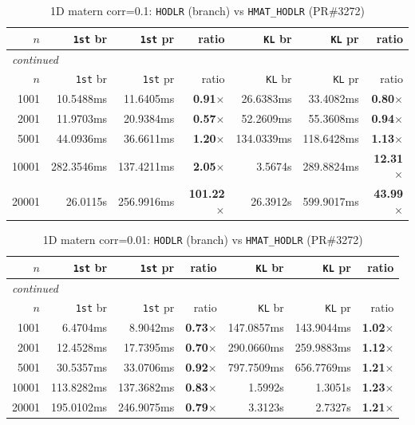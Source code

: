 \documentclass[11pt,a4paper]{article}
\begin{document}
\small\begin{center}
\begin{longtable}{rrrrrrr}
\caption{1D matern corr=0.1: \texttt{HODLR} (branch) vs \texttt{HMAT\_HODLR} (PR\#3272)}
\\\toprule
$n$ & \texttt{1st} br & \texttt{1st} pr & ratio & \texttt{KL} br & \texttt{KL} pr & ratio\\
\midrule
\endfirsthead
\multicolumn{7}{l}{\small\emph{continued}}\\
\toprule
$n$ & \texttt{1st} br & \texttt{1st} pr & ratio & \texttt{KL} br & \texttt{KL} pr & ratio\\
\midrule
\endhead

1001 & 10.5488ms & 11.6405ms & \textbf{0.91$\times$} & 26.6383ms & 33.4082ms & \textbf{0.80$\times$}\\
2001 & 11.9703ms & 20.9384ms & \textbf{0.57$\times$} & 52.2609ms & 55.3608ms & \textbf{0.94$\times$}\\
5001 & 44.0936ms & 36.6611ms & \textbf{1.20$\times$} & 134.0339ms & 118.6428ms & \textbf{1.13$\times$}\\
10001 & 282.3546ms & 137.4211ms & \textbf{2.05$\times$} & 3.5674s & 289.8824ms & \textbf{12.31$\times$}\\
20001 & 26.0115s & 256.9916ms & \textbf{101.22$\times$} & 26.3912s & 599.9017ms & \textbf{43.99$\times$}\\
\bottomrule\end{longtable}\end{center}
\small\begin{center}
\begin{longtable}{rrrrrrr}
\caption{1D matern corr=0.01: \texttt{HODLR} (branch) vs \texttt{HMAT\_HODLR} (PR\#3272)}
\\\toprule
$n$ & \texttt{1st} br & \texttt{1st} pr & ratio & \texttt{KL} br & \texttt{KL} pr & ratio\\
\midrule
\endfirsthead
\multicolumn{7}{l}{\small\emph{continued}}\\
\toprule
$n$ & \texttt{1st} br & \texttt{1st} pr & ratio & \texttt{KL} br & \texttt{KL} pr & ratio\\
\midrule
\endhead

1001 & 6.4704ms & 8.9042ms & \textbf{0.73$\times$} & 147.0857ms & 143.9044ms & \textbf{1.02$\times$}\\
2001 & 12.4528ms & 17.7395ms & \textbf{0.70$\times$} & 290.0660ms & 259.9883ms & \textbf{1.12$\times$}\\
5001 & 30.5357ms & 33.0706ms & \textbf{0.92$\times$} & 797.7509ms & 656.7769ms & \textbf{1.21$\times$}\\
10001 & 113.8282ms & 137.3682ms & \textbf{0.83$\times$} & 1.5992s & 1.3051s & \textbf{1.23$\times$}\\
20001 & 195.0102ms & 246.9075ms & \textbf{0.79$\times$} & 3.3123s & 2.7327s & \textbf{1.21$\times$}\\
\bottomrule\end{longtable}\end{center}
\end{document}
